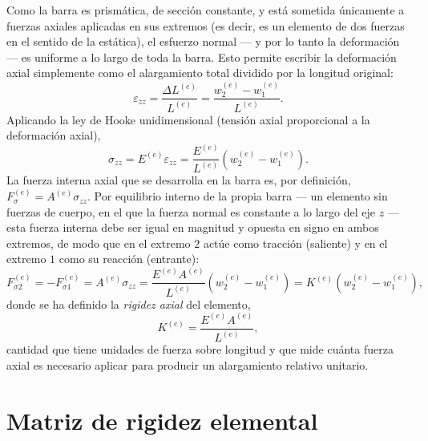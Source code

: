 Como la barra es prismática, de sección constante, y está sometida únicamente a fuerzas axiales aplicadas en sus extremos (es decir, es un elemento de dos fuerzas en el sentido de la estática), el esfuerzo normal --- y por lo tanto la deformación --- es uniforme a lo largo de toda la barra. Esto permite escribir la deformación axial simplemente como el alargamiento total dividido por la longitud original:
\begin{equation}
\varepsilon_{zz} = \frac{\Delta L^{(e)}}{L^{(e)}} = \frac{w_2^{(e)} - w_1^{(e)}}{L^{(e)}} .
\label{eq:cap04-deformacion-axial}
\end{equation}
Aplicando la ley de Hooke unidimensional (tensión axial proporcional a la deformación axial),
\begin{equation}
\sigma_{zz} = E^{(e)} \varepsilon_{zz} = \frac{E^{(e)}}{L^{(e)}} \left( w_2^{(e)} - w_1^{(e)} \right) .
\label{eq:cap04-hooke-axial}
\end{equation}
La fuerza interna axial que se desarrolla en la barra es, por definición, $F_{\sigma}^{(e)} = A^{(e)} \sigma_{zz}$. Por equilibrio interno de la propia barra --- un elemento sin fuerzas de cuerpo, en el que la fuerza normal es constante a lo largo del eje $z$ --- esta fuerza interna debe ser igual en magnitud y opuesta en signo en ambos extremos, de modo que en el extremo $2$ actúe como tracción (saliente) y en el extremo $1$ como su reacción (entrante):
\begin{equation}
F_{\sigma 2}^{(e)} = -F_{\sigma 1}^{(e)} = A^{(e)}\sigma_{zz} = \frac{E^{(e)}A^{(e)}}{L^{(e)}}\left( w_2^{(e)} - w_1^{(e)} \right) = K^{(e)}\left( w_2^{(e)} - w_1^{(e)} \right),
\label{eq:cap04-fuerza-interna}
\end{equation}
donde se ha definido la \emph{rigidez axial} del elemento,
\begin{equation}
K^{(e)} = \frac{E^{(e)}A^{(e)}}{L^{(e)}} ,
\end{equation}
cantidad que tiene unidades de fuerza sobre longitud y que mide cuánta fuerza axial es necesario aplicar para producir un alargamiento relativo unitario.

\section{Matriz de rigidez elemental}
\label{sec:cap04-matriz-rigidez}

